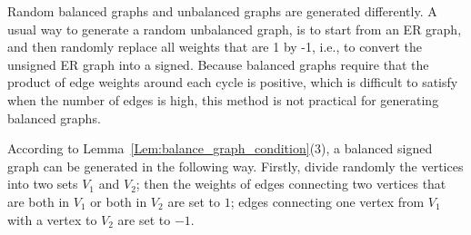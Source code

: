 \documentclass[journal]{IEEEtran}
\begin{document}
\begin{Rem}
Random balanced graphs and unbalanced graphs are generated differently. 
A usual way to generate a random unbalanced graph, is to start from  an ER graph, and then randomly replace all weights that are 1 by -1, i.e., to convert the unsigned ER graph into a signed. Because balanced graphs require that the product of edge weights around each cycle is positive, which is difficult to satisfy when the number of edges is high, this method is not practical for generating balanced graphs. 


 According to Lemma~\ref{Lem:balance_graph_condition}(3), a balanced signed graph can be generated in the following way. Firstly, divide randomly the vertices into two sets $V_1$ and $V_2$; then the weights of edges connecting two vertices that are both in $V_1$ or both in $V_2$ are set to $1$; edges connecting one vertex from $V_1$ with a vertex to $V_2$ are set to $-1$. 
\end{Rem}
%
%

\end{document}
